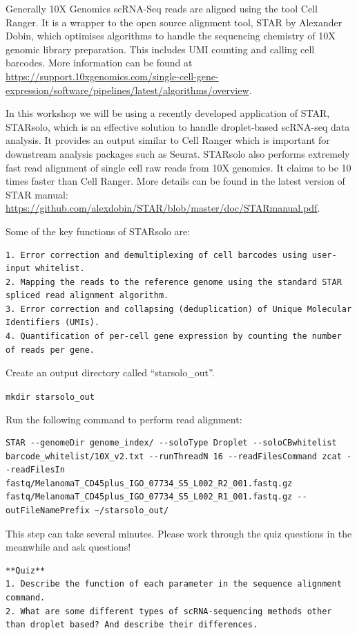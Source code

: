 \documentclass[]{book}
\begin{document}
Generally 10X Genomics scRNA-Seq reads are aligned using the tool Cell Ranger. It is a wrapper to the open source alignment tool, STAR by Alexander Dobin, which optimises algorithms to handle the sequencing chemistry of 10X genomic library preparation. This includes UMI counting and calling cell barcodes. More information can be found at \url{https://support.10xgenomics.com/single-cell-gene-expression/software/pipelines/latest/algorithms/overview}.

In this workshop we will be using a recently developed application of STAR, STARsolo, which is an effective solution to handle droplet-based scRNA-seq data analysis. It provides an output similar to Cell Ranger which is important for downstream analysis packages such as Seurat. STARsolo also performs extremely fast read alignment of single cell raw reads from 10X genomics. It claims to be 10 times faster than Cell Ranger. More details can be found in the latest version of STAR manual: \url{https://github.com/alexdobin/STAR/blob/master/doc/STARmanual.pdf}.

Some of the key functions of STARsolo are:

\begin{verbatim}
1. Error correction and demultiplexing of cell barcodes using user-input whitelist.
2. Mapping the reads to the reference genome using the standard STAR spliced read alignment algorithm.
3. Error correction and collapsing (deduplication) of Unique Molecular Identifiers (UMIs).
4. Quantification of per-cell gene expression by counting the number of reads per gene.
\end{verbatim}

Create an output directory called ``starsolo\_out''.

\texttt{mkdir\ starsolo\_out}

Run the following command to perform read alignment:

\begin{verbatim}
STAR --genomeDir genome_index/ --soloType Droplet --soloCBwhitelist barcode_whitelist/10X_v2.txt --runThreadN 16 --readFilesCommand zcat --readFilesIn fastq/MelanomaT_CD45plus_IGO_07734_S5_L002_R2_001.fastq.gz fastq/MelanomaT_CD45plus_IGO_07734_S5_L002_R1_001.fastq.gz --outFileNamePrefix ~/starsolo_out/
\end{verbatim}

This step can take several minutes. Please work through the quiz questions in the meanwhile and ask questions!

\begin{verbatim}
**Quiz**
1. Describe the function of each parameter in the sequence alignment command.
2. What are some different types of scRNA-sequencing methods other than droplet based? And describe their differences.
\end{verbatim}
\end{document}
